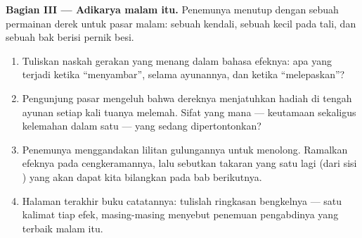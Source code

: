 \begin{problem}
\medskip\noindent\textbf{Bagian III --- Adikarya malam itu.}
Penemunya menutup dengan sebuah permainan derek untuk pasar malam:
sebuah  kendali, sebuah  kecil pada tali, dan sebuah
bak berisi pernik besi.
\begin{enumerate}[resume]
  \item Tuliskan naskah gerakan yang menang dalam bahasa efeknya: apa
        yang terjadi ketika ``menyambar'', selama ayunannya, dan
        ketika ``melepaskan''?
  \item Pengunjung pasar mengeluh bahwa dereknya menjatuhkan hadiah
        di tengah ayunan setiap kali  tuanya melemah. Sifat
         yang mana --- keutamaan sekaligus kelemahan
        dalam satu --- yang sedang dipertontonkan?
  \item Penemunya menggandakan lilitan gulungannya untuk menolong.
        Ramalkan efeknya pada cengkeramannya, lalu sebutkan takaran
        yang satu lagi (dari sisi ) yang akan dapat kita
        bilangkan pada bab berikutnya.
  \item Halaman terakhir buku catatannya: tulislah ringkasan
        bengkelnya --- satu kalimat tiap efek, masing-masing menyebut
        penemuan pengabdinya yang terbaik malam itu.
\end{enumerate}
\end{problem}
